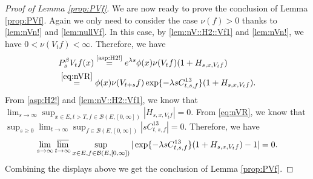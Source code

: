 \documentclass[12pt,a4paper]{amsart}
\numberwithin{equation}{section}
\theoremstyle{plain}
\theoremstyle{definition}
\theoremstyle{remark}
\begin{document}
\begin{proof}[Proof of Lemma \ref{prop:PVf}]
	We are now  ready to prove the conclusion of Lemma \ref{prop:PVf}.
	Again we only need to consider the case $\nu(f)>0$ thanks to \eqref{lem:nVn!} and  \eqref{lem:nullVf}.
	In this case, by \eqref{lem:nV::H2::Vf1} and \eqref{lem:nVn!}, we have $0<\nu(V_{t}f)<\infty$.
	Therefore, we have
\begin{align}
	& P_s^\beta V_t f(x)
	\overset{\text{\eqref{asp:H2!}}}= e^{\lambda s} \phi(x) \nu(V_tf) (1+H_{s,x,V_tf})
	\\&\overset{\eqref{eq:nVR}}= \phi(x) \nu(V_{t+s}f)
	\exp\{-\lambda s C^{13}_{t,s,f}\} (1+H_{s,x,V_tf}).
	\end{align}
	From \eqref{asp:H2!} and \eqref{lem:nV::H2::Vf1}, we know that $\lim_{s\to \infty} \sup_{x\in E, t> T, f\in \mathcal B(E,[0,\infty])}|H_{s,x,V_tf}| = 0$.
From \eqref{eq:nVR}, we know that $\sup_{s\geq 0} \lim_{t\to \infty}
\sup_{f\in \mathcal B(E,[0,\infty])} |sC^{13}_{t,s,f}| = 0$.
	Therefore, we have
 \[
\lim_{s\to \infty}\varlimsup_{t\to \infty}\sup_{x\in E, f\in \mathcal B(E,[0,\infty])}
    |\exp\{-\lambda s C^{13}_{t,s,f}\} (1+H_{s,x,V_tf})-1| = 0.
 \]
Combining the displays above we get the conclusion of Lemma \ref{prop:PVf}.
\end{proof}
\end{document}
